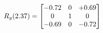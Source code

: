 \documentclass[preview]{standalone}
\begin{document}
\begin{align*}
\special{dvisvgm:raw <g id='unique000'>}R_{y}(2.37) = \begin{bmatrix}-0.72 & 0 & +0.69 \\0 & 1 & 0 \\-0.69 & 0 & -0.72\end{bmatrix}\special{dvisvgm:raw </g>}
\end{align*}
\end{document}
